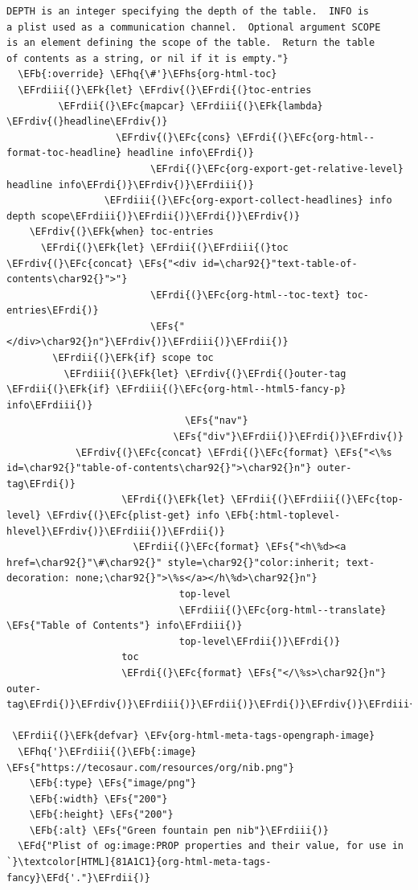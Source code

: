 \documentclass{scrartcl}
\newcommand{\EFk}[1]{\textcolor{EFk}{#1}} %
\newcommand{\EFd}[1]{\textcolor{EFd}{#1}} %
\newcommand{\EFs}[1]{\textcolor{EFs}{#1}} %
\newcommand{\EFb}[1]{\textcolor{EFb}{#1}} %
\newcommand{\EFc}[1]{\textcolor{EFc}{#1}} %
\newcommand{\EFv}[1]{\textcolor{EFv}{#1}} %
\newcommand{\EFhq}[1]{#1} %
\newcommand{\EFhs}[1]{#1} %
\newcommand{\EFrdi}[1]{#1} %
\newcommand{\EFrdii}[1]{#1} %
\newcommand{\EFrdiii}[1]{#1} %
\newcommand{\EFrdiv}[1]{#1} %
\begin{document}
\begin{Code}
\begin{Verbatim}[]
DEPTH is an integer specifying the depth of the table.  INFO is
a plist used as a communication channel.  Optional argument SCOPE
is an element defining the scope of the table.  Return the table
of contents as a string, or nil if it is empty."}
  \EFb{:override} \EFhq{\#'}\EFhs{org-html-toc}
  \EFrdiii{(}\EFk{let} \EFrdiv{(}\EFrdi{(}toc-entries
         \EFrdii{(}\EFc{mapcar} \EFrdiii{(}\EFk{lambda} \EFrdiv{(}headline\EFrdiv{)}
                   \EFrdiv{(}\EFc{cons} \EFrdi{(}\EFc{org-html--format-toc-headline} headline info\EFrdi{)}
                         \EFrdi{(}\EFc{org-export-get-relative-level} headline info\EFrdi{)}\EFrdiv{)}\EFrdiii{)}
                 \EFrdiii{(}\EFc{org-export-collect-headlines} info depth scope\EFrdiii{)}\EFrdii{)}\EFrdi{)}\EFrdiv{)}
    \EFrdiv{(}\EFk{when} toc-entries
      \EFrdi{(}\EFk{let} \EFrdii{(}\EFrdiii{(}toc \EFrdiv{(}\EFc{concat} \EFs{"<div id=\char92{}"text-table-of-contents\char92{}">"}
                         \EFrdi{(}\EFc{org-html--toc-text} toc-entries\EFrdi{)}
                         \EFs{"</div>\char92{}n"}\EFrdiv{)}\EFrdiii{)}\EFrdii{)}
        \EFrdii{(}\EFk{if} scope toc
          \EFrdiii{(}\EFk{let} \EFrdiv{(}\EFrdi{(}outer-tag \EFrdii{(}\EFk{if} \EFrdiii{(}\EFc{org-html--html5-fancy-p} info\EFrdiii{)}
                               \EFs{"nav"}
                             \EFs{"div"}\EFrdii{)}\EFrdi{)}\EFrdiv{)}
            \EFrdiv{(}\EFc{concat} \EFrdi{(}\EFc{format} \EFs{"<\%s id=\char92{}"table-of-contents\char92{}">\char92{}n"} outer-tag\EFrdi{)}
                    \EFrdi{(}\EFk{let} \EFrdii{(}\EFrdiii{(}\EFc{top-level} \EFrdiv{(}\EFc{plist-get} info \EFb{:html-toplevel-hlevel}\EFrdiv{)}\EFrdiii{)}\EFrdii{)}
                      \EFrdii{(}\EFc{format} \EFs{"<h\%d><a href=\char92{}"\#\char92{}" style=\char92{}"color:inherit; text-decoration: none;\char92{}">\%s</a></h\%d>\char92{}n"}
                              top-level
                              \EFrdiii{(}\EFc{org-html--translate} \EFs{"Table of Contents"} info\EFrdiii{)}
                              top-level\EFrdii{)}\EFrdi{)}
                    toc
                    \EFrdi{(}\EFc{format} \EFs{"</\%s>\char92{}n"} outer-tag\EFrdi{)}\EFrdiv{)}\EFrdiii{)}\EFrdii{)}\EFrdi{)}\EFrdiv{)}\EFrdiii{)}\EFrdii{)}

 \EFrdii{(}\EFk{defvar} \EFv{org-html-meta-tags-opengraph-image}
  \EFhq{'}\EFrdiii{(}\EFb{:image} \EFs{"https://tecosaur.com/resources/org/nib.png"}
    \EFb{:type} \EFs{"image/png"}
    \EFb{:width} \EFs{"200"}
    \EFb{:height} \EFs{"200"}
    \EFb{:alt} \EFs{"Green fountain pen nib"}\EFrdiii{)}
  \EFd{"Plist of og:image:PROP properties and their value, for use in `}\textcolor[HTML]{81A1C1}{org-html-meta-tags-fancy}\EFd{'."}\EFrdii{)}


\end{Verbatim}
\end{Code}
\end{document}
